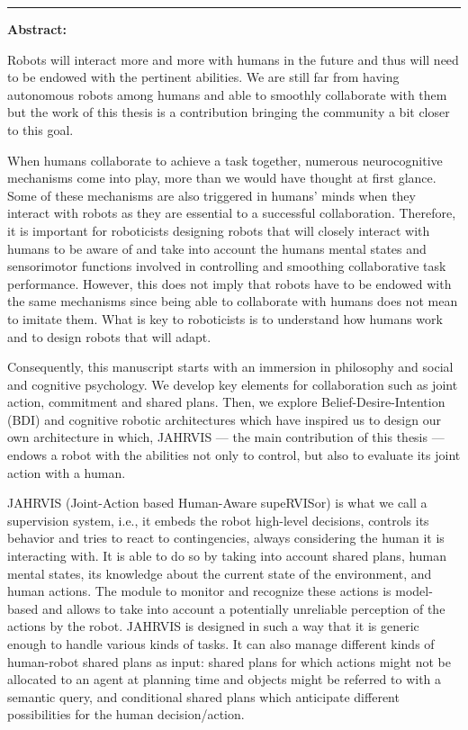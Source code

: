 \documentclass[english,a4paper,11pt,twoside]{StyleThese}
\begin{document}
\cleardoublepage
\begin{vcenterpage}
\noindent\rule[2pt]{\textwidth}{0.5pt}

\textbf{Abstract:}

Robots will interact more and more with humans in the future and thus will need to be endowed with the pertinent abilities. We are still far from having autonomous robots among humans and able to smoothly collaborate with them but the work of this thesis is a contribution bringing the community a bit closer to this goal. 


When humans collaborate to achieve a task together, numerous neurocognitive mechanisms come into play, more than we would have thought at first glance. Some of these mechanisms are also triggered in humans’ minds when they interact with robots as they are essential to a successful collaboration. Therefore, it is important for roboticists designing robots that will closely interact with humans to be aware of and take into account the humans mental states and sensorimotor functions involved in controlling and smoothing collaborative task performance. However, this does not imply that robots have to be endowed with the same mechanisms since being able to collaborate with humans does not mean to imitate them. What is key to roboticists is to understand how humans work and to design  robots that will adapt. 


Consequently, this manuscript starts with an immersion in philosophy and social and cognitive psychology. We develop key elements for collaboration such as joint action, commitment and shared plans. Then, we explore Belief-Desire-Intention (BDI) and cognitive robotic architectures  which have inspired us to design our own architecture in which, JAHRVIS —  the main contribution of this thesis — endows a robot with the abilities not only to control, but also to evaluate its joint action with a human. 


JAHRVIS (Joint-Action based Human-Aware supeRVISor) is what we call a supervision system, i.e., it embeds the robot high-level decisions, controls its behavior and tries to react to contingencies, always considering the human it is interacting with. It is able to do so by taking into account shared plans, human mental states, its knowledge about the current state of the environment, and human actions. The module to monitor and recognize these actions is model-based and allows to take into account a potentially unreliable perception of the actions by the robot. JAHRVIS is designed in such a way that it is generic enough to handle various kinds of tasks. It can also manage  different kinds of human-robot shared plans as input: shared plans for which actions might not be allocated to an agent at planning time and objects might be referred to with a semantic query, and conditional shared plans which anticipate different possibilities for the human decision/action. 



\end{vcenterpage}
\end{document}
